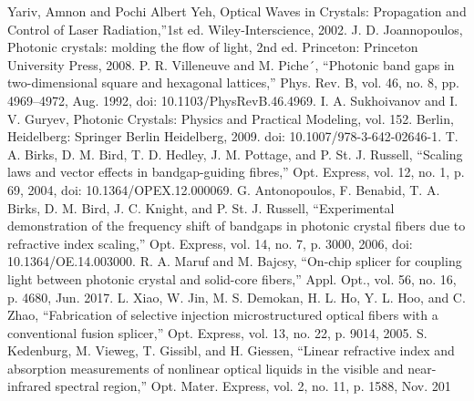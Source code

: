 \begin{thebibliography}{99}
 Yariv, Amnon and Pochi Albert Yeh, Optical Waves in Crystals: Propagation and Control of Laser Radiation,”1st ed. Wiley-Interscience, 2002.
 J. D. Joannopoulos, Photonic crystals: molding the flow of light, 2nd ed. Princeton: Princeton University Press, 2008.
 P. R. Villeneuve and M. Piche´, “Photonic band gaps in two-dimensional square and hexagonal lattices,” Phys. Rev. B, vol. 46, no. 8, pp. 4969–4972, Aug. 1992, doi: 10.1103/PhysRevB.46.4969.
 I. A. Sukhoivanov and I. V. Guryev, Photonic Crystals: Physics and Practical Modeling, vol. 152. Berlin, Heidelberg: Springer Berlin Heidelberg, 2009. doi: 10.1007/978-3-642-02646-1.
 T. A. Birks, D. M. Bird, T. D. Hedley, J. M. Pottage, and P. St. J. Russell, “Scaling laws and vector effects in bandgap-guiding fibres,” Opt. Express, vol. 12, no. 1, p. 69, 2004, doi: 10.1364/OPEX.12.000069.
 G. Antonopoulos, F. Benabid, T. A. Birks, D. M. Bird, J. C. Knight, and P. St. J. Russell, “Experimental demonstration of the frequency shift of bandgaps in photonic crystal fibers due to refractive index scaling,” Opt. Express, vol. 14, no. 7, p. 3000, 2006, doi: 10.1364/OE.14.003000.
 R. A. Maruf and M. Bajcsy, “On-chip splicer for coupling light between
photonic crystal and solid-core fibers,” Appl. Opt., vol. 56, no. 16, p.
4680, Jun. 2017.
 L. Xiao, W. Jin, M. S. Demokan, H. L. Ho, Y. L. Hoo, and C. Zhao,
“Fabrication of selective injection microstructured optical fibers with a
conventional fusion splicer,” Opt. Express, vol. 13, no. 22, p. 9014, 2005.
 S. Kedenburg, M. Vieweg, T. Gissibl, and H. Giessen, “Linear refractive
index and absorption measurements of nonlinear optical liquids in the
visible and near-infrared spectral region,” Opt. Mater. Express, vol. 2,
no. 11, p. 1588, Nov. 201


\end{thebibliography}
